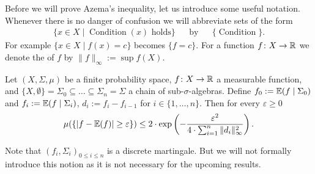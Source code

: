 Before we will prove Azema's inequality, let us introduce some useful notation. Whenever there is no danger of confusion we will abbreviate sets of the form
\begin{align*}
	\{x\in X\mid \operatorname{Condition}(x)\text{ holds}\} &   & \text{by} &   & \{\operatorname{Condition}\}. 
\end{align*}
For example $\{x\in X\mid f(x)= c\}$ becomes $\{f= c\}$.
For a function $f\colon X\to\mathbb{R}$ we denote the  of $f$ by $\|f\|_\infty:=\sup f(X)$.
		
\begin{lemma}\label{lem:azema}
	Let $(X,\Sigma,\mu)$ be a finite probability space, $f\colon X\to\mathbb{R}$ a measurable function, and $\{X,\emptyset\}=\Sigma_0\subseteq\dots\subseteq\Sigma_n=\Sigma$ a chain of sub-$\sigma$-algebras. Define $f_0:=\mathbb{E}(f\mid\Sigma_0)$ and $f_i:=\mathbb{E}(f\mid\Sigma_i)$, $d_i:=f_i-f_{i-1}$ for $i\in\{1,\dots,n\}$. Then for every $\varepsilon\geq0$
	\[\mu(\{|f-\mathbb{E}(f)|\geq \varepsilon\})\leq 2\cdot\exp\left(-\frac{\varepsilon^2}{4\cdot\sum_{i=1}^{n}\|d_i\|^2_\infty}\right).\]
\end{lemma}
Note that $(f_i,\Sigma_i)_{0\leq i\leq n}$ is a discrete martingale. But we will not formally introduce this notion as it is not necessary for the upcoming results.
		
